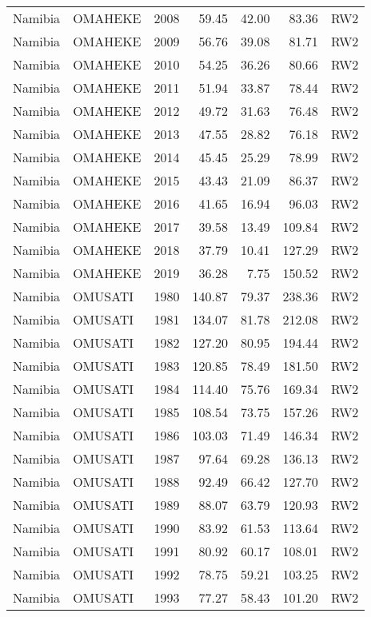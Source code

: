 \begin{longtable}{lllrrrl}
  Namibia & OMAHEKE & 2008 & 59.45 & 42.00 & 83.36 & RW2 \\ 
  Namibia & OMAHEKE & 2009 & 56.76 & 39.08 & 81.71 & RW2 \\ 
  Namibia & OMAHEKE & 2010 & 54.25 & 36.26 & 80.66 & RW2 \\ 
  Namibia & OMAHEKE & 2011 & 51.94 & 33.87 & 78.44 & RW2 \\ 
  Namibia & OMAHEKE & 2012 & 49.72 & 31.63 & 76.48 & RW2 \\ 
  Namibia & OMAHEKE & 2013 & 47.55 & 28.82 & 76.18 & RW2 \\ 
  Namibia & OMAHEKE & 2014 & 45.45 & 25.29 & 78.99 & RW2 \\ 
  Namibia & OMAHEKE & 2015 & 43.43 & 21.09 & 86.37 & RW2 \\ 
  Namibia & OMAHEKE & 2016 & 41.65 & 16.94 & 96.03 & RW2 \\ 
  Namibia & OMAHEKE & 2017 & 39.58 & 13.49 & 109.84 & RW2 \\ 
  Namibia & OMAHEKE & 2018 & 37.79 & 10.41 & 127.29 & RW2 \\ 
  Namibia & OMAHEKE & 2019 & 36.28 & 7.75 & 150.52 & RW2 \\ 
  Namibia & OMUSATI & 1980 & 140.87 & 79.37 & 238.36 & RW2 \\ 
  Namibia & OMUSATI & 1981 & 134.07 & 81.78 & 212.08 & RW2 \\ 
  Namibia & OMUSATI & 1982 & 127.20 & 80.95 & 194.44 & RW2 \\ 
  Namibia & OMUSATI & 1983 & 120.85 & 78.49 & 181.50 & RW2 \\ 
  Namibia & OMUSATI & 1984 & 114.40 & 75.76 & 169.34 & RW2 \\ 
  Namibia & OMUSATI & 1985 & 108.54 & 73.75 & 157.26 & RW2 \\ 
  Namibia & OMUSATI & 1986 & 103.03 & 71.49 & 146.34 & RW2 \\ 
  Namibia & OMUSATI & 1987 & 97.64 & 69.28 & 136.13 & RW2 \\ 
  Namibia & OMUSATI & 1988 & 92.49 & 66.42 & 127.70 & RW2 \\ 
  Namibia & OMUSATI & 1989 & 88.07 & 63.79 & 120.93 & RW2 \\ 
  Namibia & OMUSATI & 1990 & 83.92 & 61.53 & 113.64 & RW2 \\ 
  Namibia & OMUSATI & 1991 & 80.92 & 60.17 & 108.01 & RW2 \\ 
  Namibia & OMUSATI & 1992 & 78.75 & 59.21 & 103.25 & RW2 \\ 
  Namibia & OMUSATI & 1993 & 77.27 & 58.43 & 101.20 & RW2 \\ 

\end{longtable}
